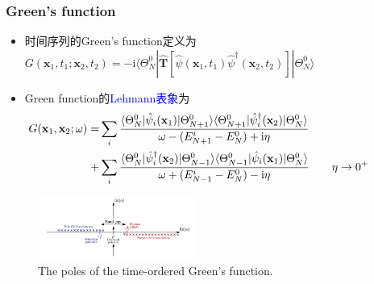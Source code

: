 {\frame
{
	\frametitle{\textrm{Green's function}}
	\begin{itemize}
\vspace{-7pt}
		\item 时间序列的\textrm{Green's function}定义为$G(\mathbf{x}_1,t_1;\mathbf{x}_2,t_2)=-\mathrm{i}\langle\Theta_N^0|\hat{\mathbf{T}}[\hat\psi(\mathbf{x}_1,t_1)\hat\psi^{\dag}(\mathbf{x}_2,t_2)]|\Theta_N^0\rangle$
		\item \textrm{Green function}的\textcolor{blue}{\textrm{Lehmann}表象}为
			\begin{displaymath}
				\begin{aligned}
					\hspace*{-35pt}
					G(\mathbf{x}_1,\mathbf{x}_2;\omega)=&\sum\limits_i\dfrac{\langle\Theta_N^0|\hat\psi_i(\mathbf{x}_1)|\Theta_{N+1}^0\rangle\langle\Theta_{N+1}^0|\hat\psi_i^{\dag}(\mathbf{x}_2)|\Theta_N^0\rangle}{\omega-(E_{N+1}^i-E_N^0)+\mathrm{i}\eta}\\
					+&\sum\limits_i\dfrac{\langle\Theta_N^0|\hat\psi_i^{\dag}(\mathbf{x}_2)|\Theta_{N-1}^0\rangle\langle\Theta_{N-1}^0|\hat\psi_i(\mathbf{x}_1)|\Theta_N^0\rangle}{\omega+(E_{N-1}^i-E_N^0)-\mathrm{i}\eta}\qquad\eta\rightarrow0^+
				\end{aligned}
			\end{displaymath}
			{\fontsize{6.2pt}{6.2pt}}
	\end{itemize}
\begin{figure}[h!]
\centering
\vspace{-5pt}
\includegraphics[height=0.80in,width=2.05in,viewport=30 1 660 265,clip]{Figures/GW-0.png}
\caption{\textrm{\tiny{The poles of the time-ordered Green's function.}}}%
\label{GW-0}
\end{figure}
}

}

